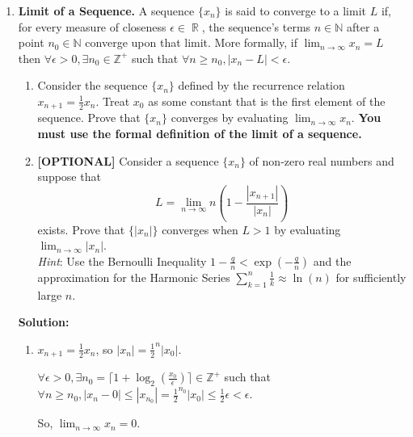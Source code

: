 \documentclass{article}
\DeclareMathOperator{\R}{\mathbb{R}}
\newenvironment{solution}{\color{blue} \smallskip \textbf{Solution:}}{}
\begin{document}
\begin{enumerate}

    \item 
    \textbf{Limit of a Sequence.} A sequence $\{x_n\}$ is said to converge to a limit $L$ if, for every measure of closeness $\epsilon \in \R$, the sequence's terms $n \in \mathbb{N}$ after a point $n_0 \in \mathbb{N}$ converge upon that limit. 
    More formally, if $\lim_{n \to \infty}x_n = L$ then $\forall \epsilon > 0, \exists n_0 \in \mathbb{Z}^+$ such that $\forall n \geq n_0, |x_n - L| < \epsilon$.
    \begin{enumerate}
        \item
        Consider the sequence $\{x_n\}$ defined by the recurrence relation $x_{n+1} = \frac{1}{2}x_n$. 
        Treat $x_0$ as some constant that is the first element of the sequence.
        Prove that $\{ x_n \}$ converges by evaluating $\lim_{n\to\infty} x_n$. 
        \textbf{You must use the formal definition of the limit of a sequence.}
        \item 
        \textbf{[OPTIONAL]} Consider a sequence $\{x_n\}$ of non-zero real numbers and suppose that 
        \[L = \lim_{n \to \infty} n\left(1 - \frac{|x_{n+1}|}{|x_n|}\right)\] 
        exists. 
        Prove that $\{ \vert x_n \vert \}$ converges when $L > 1$ by evaluating $\lim_{n\to \infty}|x_n|$. \\
        \emph{Hint}: Use the Bernoulli Inequality $1 - \frac{q}{n} < \exp(-\frac{q}{n})$ and the approximation for the Harmonic Series $\sum_{k=1}^n\frac{1}{k} \approx \ln(n)$ for sufficiently large $n$.
    \end{enumerate}

    \begin{solution}
        \begin{enumerate}
            \item 
            $x_{n+1} = \frac{1}{2}x_n$, so $|x_n| = {\frac{1}{2}}^n |x_0|$.

            $\forall \epsilon > 0, \exists n_0 = \lceil 1 + \log_{2}(\frac{x_0}{\epsilon}) \rceil \in \mathbb{Z}^+$ such that $\forall n \geq n_0, |x_n - 0| \leq |x_{n_0}| = {\frac{1}{2}}^{n_0} |x_0| \leq \frac{1}{2} \epsilon < \epsilon$. 

            So, $\lim_{n\to\infty} x_n = 0$.


\end{enumerate}
\end{solution}
\end{enumerate}
\end{document}
